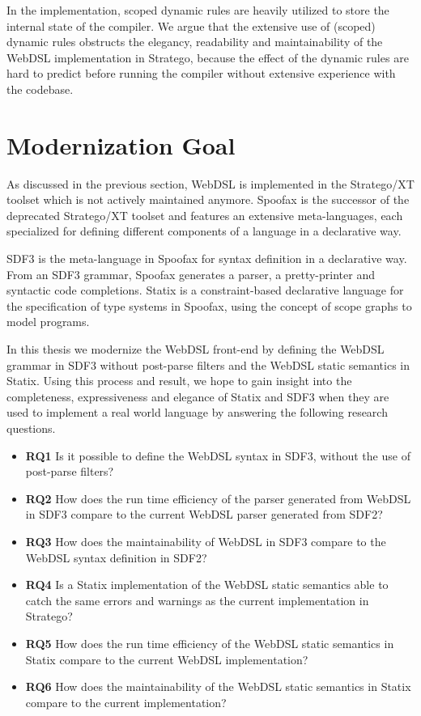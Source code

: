       In the implementation, scoped dynamic rules are heavily utilized to store the internal state of the compiler. We argue that the extensive use of (scoped) dynamic rules obstructs the elegancy, readability and maintainability of the WebDSL implementation in Stratego, because the effect of the dynamic rules are hard to predict before running the compiler without extensive experience with the codebase.

  \section{\label{sec:modernization}Modernization Goal}

    As discussed in the previous section, WebDSL is implemented in the Stratego/XT toolset which is not actively maintained anymore. Spoofax is the successor of the deprecated Stratego/XT toolset and features an extensive meta-languages, each specialized for defining different components of a language in a declarative way.

    SDF3 \autocite{VollebregtKV12,AmorimV20} is the meta-language in Spoofax for syntax definition in a declarative way. From an SDF3 grammar, Spoofax generates a parser, a pretty-printer and syntactic code completions. Statix \autocite{VanAntwerpen2018} is a constraint-based declarative language for the specification of type systems in Spoofax, using the concept of scope graphs \autocite{Neron2015} to model programs.

    In this thesis we modernize the WebDSL front-end by defining the WebDSL grammar in SDF3 without post-parse filters and the WebDSL static semantics in Statix. Using this process and result, we hope to gain insight into the completeness, expressiveness and elegance of Statix and SDF3 when they are used to implement a real world language by answering the following research questions.

    \begin{itemize}
      \item \textbf{RQ1} Is it possible to define the WebDSL syntax in SDF3, without the use of post-parse filters?
      \item \textbf{RQ2} How does the run time efficiency of the parser generated from WebDSL in SDF3 compare to the current WebDSL parser generated from SDF2?
      \item \textbf{RQ3} How does the maintainability of WebDSL in SDF3 compare to the WebDSL syntax definition in SDF2?
      \item \textbf{RQ4} Is a Statix implementation of the WebDSL static semantics able to catch the same errors and warnings as the current implementation in Stratego?
      \item \textbf{RQ5} How does the run time efficiency of the WebDSL static semantics in Statix compare to the current WebDSL implementation?
      \item \textbf{RQ6} How does the maintainability of the WebDSL static semantics in Statix compare to the current implementation?
    \end{itemize}

